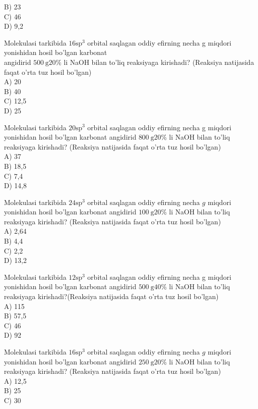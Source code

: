 B) 23\\
C) 46\\
D) 9,2
  \item Molekulasi tarkibida $16 \mathrm{sp}^{3}$ orbital saqlagan oddiy efirning necha g miqdori yonishidan hosil bo'lgan karbonat\\
angidirid $500 \mathrm{~g} 20 \%$ li NaOH bilan to'liq reaksiyaga kirishadi? (Reaksiya natijasida faqat o'rta tuz hosil bo'lgan)\\
A) 20\\
B) 40\\
C) 12,5\\
D) 25
  \item Molekulasi tarkibida $20 \mathrm{sp}^{3}$ orbital saqlagan oddiy efirning necha g miqdori yonishidan hosil bo'lgan karbonat angidirid $800 \mathrm{~g} 20 \%$ li NaOH bilan to'liq reaksiyaga kirishadi? (Reaksiya natijasida faqat o'rta tuz hosil bo'lgan)\\
A) 37\\
B) 18,5\\
C) 7,4\\
D) 14,8
  \item Molekulasi tarkibida $24 \mathrm{sp}^{3}$ orbital saqlagan oddiy efirning necha $g$ miqdori yonishidan hosil bo'lgan karbonat angidirid $100 \mathrm{~g} 20 \%$ li NaOH bilan to'liq reaksiyaga kirishadi? (Reaksiya natijasida faqat o'rta tuz hosil bo'lgan)\\
A) 2,64\\
B) 4,4\\
C) 2,2\\
D) 13,2
  \item Molekulasi tarkibida $12 \mathrm{sp}^{3}$ orbital saqlagan oddiy efirning necha g miqdori yonishidan hosil bo'lgan karbonat angidirid $500 \mathrm{~g} 40 \%$ li NaOH bilan to'liq reaksiyaga kirishadi?(Reaksiya natijasida faqat o'rta tuz hosil bo'lgan)\\
A) 115\\
B) 57,5\\
C) 46\\
D) 92
  \item Molekulasi tarkibida $16 \mathrm{sp}^{3}$ orbital saqlagan oddiy efirning necha $g$ miqdori yonishidan hosil bo'lgan karbonat angidirid $250 \mathrm{~g} 20 \%$ li NaOH bilan to'liq reaksiyaga kirishadi? (Reaksiya natijasida faqat o'rta tuz hosil bo'lgan)\\
A) 12,5\\
B) 25\\
C) 30\\
